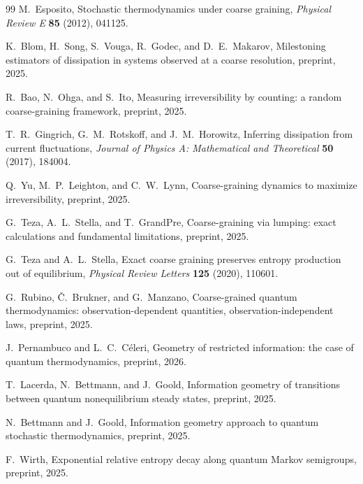 \documentclass[11pt,a4paper]{article}
\numberwithin{equation}{section}
\theoremstyle{thmcompact}
\theoremstyle{remark}
\begin{document}
\begin{thebibliography}{99}
M.~Esposito,
\newblock Stochastic thermodynamics under coarse graining,
\newblock \emph{Physical Review E} \textbf{85} (2012), 041125.

K.~Blom, H.~Song, S.~Vouga, R.~Godec, and D.~E.~Makarov,
\newblock Milestoning estimators of dissipation in systems observed at a coarse resolution,
\newblock preprint, 2025.

R.~Bao, N.~Ohga, and S.~Ito,
\newblock Measuring irreversibility by counting: a random coarse-graining framework,
\newblock preprint, 2025.

T.~R.~Gingrich, G.~M.~Rotskoff, and J.~M.~Horowitz,
\newblock Inferring dissipation from current fluctuations,
\newblock \emph{Journal of Physics A: Mathematical and Theoretical} \textbf{50} (2017), 184004.

Q.~Yu, M.~P.~Leighton, and C.~W.~Lynn,
\newblock Coarse-graining dynamics to maximize irreversibility,
\newblock preprint, 2025.

G.~Teza, A.~L.~Stella, and T.~GrandPre,
\newblock Coarse-graining via lumping: exact calculations and fundamental limitations,
\newblock preprint, 2025.

G.~Teza and A.~L.~Stella,
\newblock Exact coarse graining preserves entropy production out of equilibrium,
\newblock \emph{Physical Review Letters} \textbf{125} (2020), 110601.

G.~Rubino, {\v C}.~Brukner, and G.~Manzano,
\newblock Coarse-grained quantum thermodynamics: observation-dependent quantities, observation-independent laws,
\newblock preprint, 2025.

J.~Pernambuco and L.~C.~C\'eleri,
\newblock Geometry of restricted information: the case of quantum thermodynamics,
\newblock preprint, 2026.

T.~Lacerda, N.~Bettmann, and J.~Goold,
\newblock Information geometry of transitions between quantum nonequilibrium steady states,
\newblock preprint, 2025.

N.~Bettmann and J.~Goold,
\newblock Information geometry approach to quantum stochastic thermodynamics,
\newblock preprint, 2025.

F.~Wirth,
\newblock Exponential relative entropy decay along quantum Markov semigroups,
\newblock preprint, 2025.


\end{thebibliography}
\end{document}
